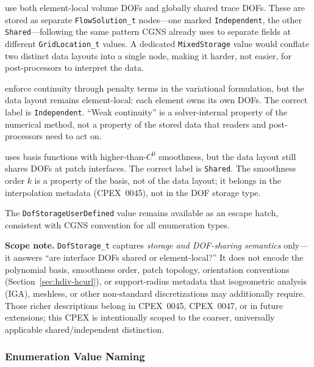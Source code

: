 \documentclass[11pt,letterpaper]{article}
\begin{document}
\begin{description}[leftmargin=2em]
\item[HDG and mixed-layout methods] use both element-local
  volume DOFs and globally shared trace DOFs.  These are stored as
  separate \texttt{FlowSolution\_t} nodes---one marked
  \texttt{Independent}, the other
  \texttt{Shared}---following the same pattern CGNS already
  uses to separate fields at different \texttt{GridLocation\_t} values.
  A dedicated \texttt{MixedStorage} value would conflate two distinct
  data layouts into a single node, making it harder, not easier, for
  post-processors to interpret the data.

\item[Penalized / weakly-continuous DG methods] enforce continuity
  through penalty terms in the variational formulation, but the data
  layout remains element-local: each element owns its own DOFs.  The
  correct label is \texttt{Independent}.  ``Weak continuity''
  is a solver-internal property of the numerical method, not a property
  of the stored data that readers and post-processors need to act on.

\item[Isogeometric analysis ($C^k$, $k \geq 1$)] uses basis functions
  with higher-than-$C^0$ smoothness, but the data layout still
  shares DOFs at patch interfaces.  The
  correct label is \texttt{Shared}.  The smoothness order
  $k$ is a property of the basis, not of the data layout; it belongs in
  the interpolation metadata (CPEX~0045), not in the DOF storage type.
\end{description}

The \texttt{DofStorageUserDefined} value remains available
as an escape hatch, consistent with CGNS convention for all
enumeration types.

\textbf{Scope note.}  \texttt{DofStorage\_t} captures
\emph{storage and DOF-sharing semantics} only---it answers
``are interface DOFs shared or element-local?''  It does not
encode the polynomial basis, smoothness order, patch topology,
orientation conventions (Section~\ref{sec:hdiv-hcurl}), or
support-radius metadata that isogeometric analysis (IGA), meshless, or other
non-standard discretizations may additionally require.  Those
richer descriptions belong in CPEX~0045, CPEX~0047,
or in future extensions; this CPEX is intentionally
scoped to the coarser, universally applicable
shared/independent distinction.

\subsubsection{Enumeration Value Naming}
\label{sec:value-naming}
\end{document}
